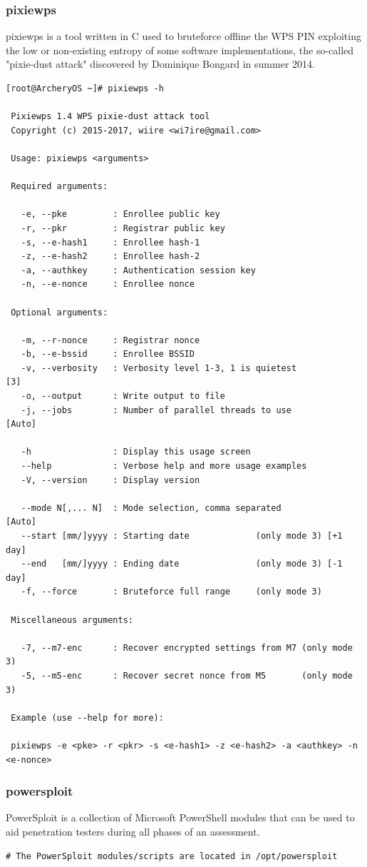 \documentclass{article}
\begin{document}
\subsubsection{pixiewps}
pixiewps is a tool written in C used to bruteforce offline the WPS PIN exploiting the low or non-existing entropy of some software implementations, the so-called "pixie-dust attack" discovered by Dominique Bongard in summer 2014.
\begin{lstlisting}
[root@ArcheryOS ~]# pixiewps -h

 Pixiewps 1.4 WPS pixie-dust attack tool
 Copyright (c) 2015-2017, wiire <wi7ire@gmail.com>

 Usage: pixiewps <arguments>

 Required arguments:

   -e, --pke         : Enrollee public key
   -r, --pkr         : Registrar public key
   -s, --e-hash1     : Enrollee hash-1
   -z, --e-hash2     : Enrollee hash-2
   -a, --authkey     : Authentication session key
   -n, --e-nonce     : Enrollee nonce

 Optional arguments:

   -m, --r-nonce     : Registrar nonce
   -b, --e-bssid     : Enrollee BSSID
   -v, --verbosity   : Verbosity level 1-3, 1 is quietest           [3]
   -o, --output      : Write output to file
   -j, --jobs        : Number of parallel threads to use         [Auto]

   -h                : Display this usage screen
   --help            : Verbose help and more usage examples
   -V, --version     : Display version

   --mode N[,... N]  : Mode selection, comma separated           [Auto]
   --start [mm/]yyyy : Starting date             (only mode 3) [+1 day]
   --end   [mm/]yyyy : Ending date               (only mode 3) [-1 day]
   -f, --force       : Bruteforce full range     (only mode 3)

 Miscellaneous arguments:

   -7, --m7-enc      : Recover encrypted settings from M7 (only mode 3)
   -5, --m5-enc      : Recover secret nonce from M5       (only mode 3)

 Example (use --help for more):

 pixiewps -e <pke> -r <pkr> -s <e-hash1> -z <e-hash2> -a <authkey> -n <e-nonce>
\end{lstlisting}

\subsubsection{powersploit}
PowerSploit is a collection of Microsoft PowerShell modules that can be used to aid penetration testers during all phases of an assessment.
\begin{lstlisting}
# The PowerSploit modules/scripts are located in /opt/powersploit
\end{lstlisting}
\end{document}
